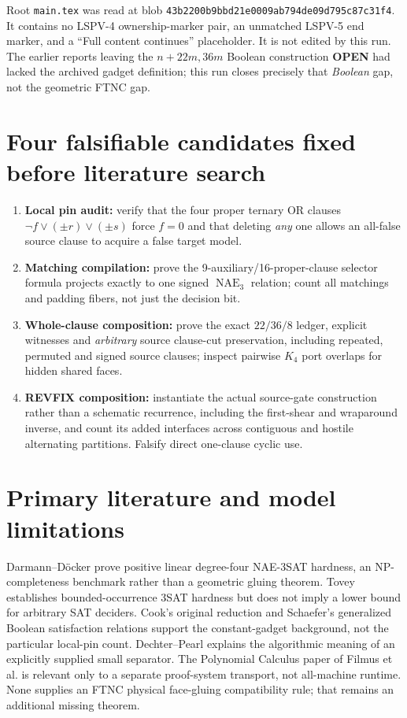 \documentclass[11pt]{article}
\newcommand{\NAE}{\operatorname{NAE}}
\newcommand{\OPEN}{\textbf{OPEN}}
\begin{document}
Root \texttt{main.tex} was read at blob
\texttt{43b2200b9bbd21e0009ab794de09d795c87c31f4}.
It contains no LSPV-4 ownership-marker pair, an unmatched LSPV-5 end marker,
and a ``Full content continues'' placeholder.  It is not edited by this run.
The earlier reports leaving the $n+22m,36m$ Boolean construction \OPEN{}
had lacked the archived gadget definition; this run closes precisely that
\emph{Boolean} gap, not the geometric FTNC gap.

\section{Four falsifiable candidates fixed before literature search}
\begin{enumerate}
\item \textbf{Local pin audit:} verify that the four proper ternary OR clauses
$\neg f\vee(\pm r)\vee(\pm s)$ force $f=0$ and that deleting \emph{any}
one allows an all-false source clause to acquire a false target model.
\item \textbf{Matching compilation:} prove the 9-auxiliary/16-proper-clause
selector formula projects exactly to one signed $\NAE_3$ relation; count
all matchings and padding fibers, not just the decision bit.
\item \textbf{Whole-clause composition:} prove the exact $22/36/8$ ledger,
explicit witnesses and \emph{arbitrary} source clause-cut preservation,
including repeated, permuted and signed source clauses; inspect pairwise
$K_4$ port overlaps for hidden shared faces.
\item \textbf{REVFIX composition:} instantiate the actual source-gate
construction rather than a schematic recurrence, including the first-shear
and wraparound inverse, and count its added interfaces across contiguous
and hostile alternating partitions.  Falsify direct one-clause cyclic use.
\end{enumerate}

\section{Primary literature and model limitations}
Darmann--D\"ocker \cite{DD20} prove positive linear degree-four NAE-3SAT
hardness, an NP-completeness benchmark rather than a geometric gluing theorem.
Tovey \cite{Tovey84} establishes bounded-occurrence 3SAT hardness but does not
imply a lower bound for arbitrary SAT deciders.  Cook's original reduction
\cite{Cook71} and Schaefer's generalized Boolean satisfaction relations
\cite{Schaefer78} support the constant-gadget background, not the particular
local-pin count.  Dechter--Pearl \cite{DP89} explains the algorithmic meaning
of an explicitly supplied small separator.  The Polynomial Calculus paper of
Filmus et al. \cite{Filmus25} is relevant only to a separate proof-system
transport, not all-machine runtime.  None supplies an FTNC physical
face-gluing compatibility rule; that remains an additional missing theorem.
\end{document}
